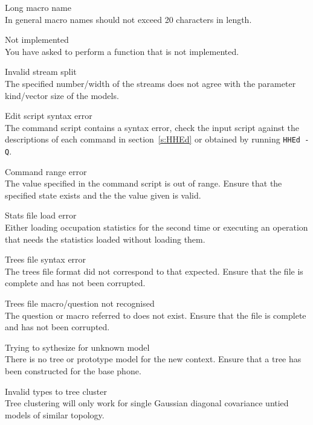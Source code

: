 \begin{itemize}
\begin{itemize}
    Long macro name\\
        In general macro names should not exceed 20 characters in length.

    Not implemented\\
        You have asked  to perform a function that is not 
        implemented.

    Invalid stream split\\
        The specified number/width of the streams does not agree with the 
        parameter kind/vector size of the models.

    Edit script syntax error\\
        The  command script contains a syntax error, check the 
        input script against the descriptions of each command in 
        section~\ref{s:HHEd} or obtained by running \texttt{HHEd -Q}.

    Command range error\\
        The value specified in the command script is out of range.  Ensure that
        the specified state exists and the the value given is valid.

 Stats file load error\\
        Either loading occupation statistics for the second time or executing 
        an operation that needs the statistics loaded without loading them.

    Trees file syntax error\\
        The trees file format did not correspond to that expected.  Ensure that
        the file is complete and has not been corrupted.

    Trees file macro/question not recognised\\
        The question or macro referred to does not exist.  Ensure that the file
        is complete and has not been corrupted.

    Trying to sythesize for unknown model\\
        There is no tree or prototype model for the new context.  Ensure that a
        tree has been constructed for the base phone.

 Invalid types to tree cluster\\
        Tree clustering will only work for single Gaussian diagonal
        covariance untied models of similar topology.

\end{itemize}


\end{itemize}
